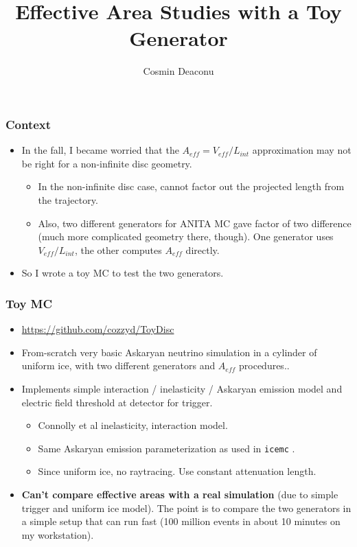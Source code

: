 \documentclass[hyperref={pdfpagelabels=false},aspectratio=169]{beamer} \mode<presentation> { \usetheme{Boadilla} }
\title[Toy Studies]{Effective Area Studies with a Toy Generator}
\author{Cosmin Deaconu}
\institute{UChicago/KICP}
\begin{document}
 

\begin{frame}[plain]
  \maketitle
\end{frame} 

\begin{frame}
\frametitle{Context} 
\begin{itemize} 
\item In the fall, I became worried that the $A_{eff} = V_{eff}/L_{int}$ approximation may not be right for a non-infinite disc geometry. 
\begin{itemize}
\item In the non-infinite disc case, cannot factor out the projected length from the trajectory. 
\item Also, two different generators for ANITA MC gave factor of two difference (much more complicated geometry there, though). One generator uses $V_{eff}/L_{int}$, the other computes $A_{eff}$ directly. 
\end{itemize}
\item So I wrote a toy MC to test the two generators. 
\end{itemize} 
\end{frame} 

\begin{frame} 
\frametitle{Toy MC} 
\begin{itemize}
\item \url{https://github.com/cozzyd/ToyDisc} 
\item From-scratch very basic Askaryan neutrino simulation in a cylinder of uniform ice, with two different generators and $A_{eff}$ procedures..  
\item Implements simple interaction / inelasticity / Askaryan emission model and electric field threshold at detector for trigger. 
\begin{itemize}
\item Connolly et al inelasticity, interaction model. 
\item Same Askaryan emission parameterization as used in \texttt{icemc} . 
\item Since uniform ice, no raytracing.  Use constant attenuation length. 
\end{itemize} 
\item \textbf{Can't compare effective areas with a real simulation} (due to simple trigger and uniform ice model). The point is to compare the two generators in a simple setup that can run fast (100 million events in about 10 minutes on my workstation). 
\end{itemize}
\end{frame}
\end{document}
